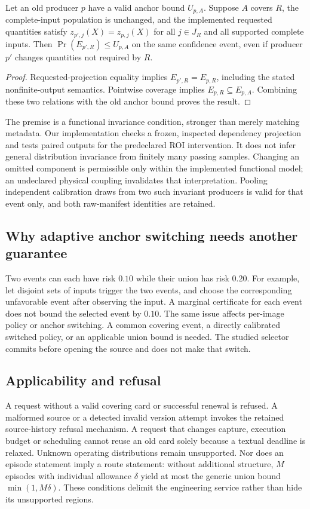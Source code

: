 \begin{proposition}\label{prop:r9-transfer}
Let an old producer $p$ have a valid anchor bound $U_{p,A}$. Suppose $A$ covers $R$, the complete-input population is unchanged, and the implemented requested quantities satisfy $z_{p',j}(X)=z_{p,j}(X)$ for all $j\in J_R$ and all supported complete inputs. Then $\Pr(E_{p',R})\le U_{p,A}$ on the same confidence event, even if producer $p'$ changes quantities not required by $R$.
\end{proposition}
\begin{proof}
Requested-projection equality implies $E_{p',R}=E_{p,R}$, including the stated nonfinite-output semantics. Pointwise coverage implies $E_{p,R}\subseteq E_{p,A}$. Combining these two relations with the old anchor bound proves the result.
\end{proof}
The premise is a functional invariance condition, stronger than merely matching metadata. Our implementation checks a frozen, inspected dependency projection and tests paired outputs for the predeclared ROI intervention. It does not infer general distribution invariance from finitely many passing samples. Changing an omitted component is permissible only within the implemented functional model; an undeclared physical coupling invalidates that interpretation. Pooling independent calibration draws from two such invariant producers is valid for that event only, and both raw-manifest identities are retained.

\subsection{Why adaptive anchor switching needs another guarantee}
Two events can each have risk $0.10$ while their union has risk $0.20$. For example, let disjoint sets of inputs trigger the two events, and choose the corresponding unfavorable event after observing the input. A marginal certificate for each event does not bound the selected event by $0.10$. The same issue affects per-image policy or anchor switching. A common covering event, a directly calibrated switched policy, or an applicable union bound is needed. The studied selector commits before opening the source and does not make that switch.

\subsection{Applicability and refusal}
A request without a valid covering card or successful renewal is refused. A malformed source or a detected invalid version attempt invokes the retained source-history refusal mechanism. A request that changes capture, execution budget or scheduling cannot reuse an old card solely because a textual deadline is relaxed. Unknown operating distributions remain unsupported. Nor does an episode statement imply a route statement: without additional structure, $M$ episodes with individual allowance $\delta$ yield at most the generic union bound $\min(1,M\delta)$. These conditions delimit the engineering service rather than hide its unsupported regions.

